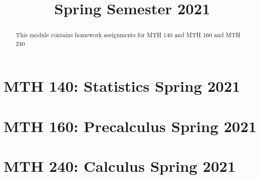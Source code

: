 \documentclass{xourse}
\title{Spring Semester 2021}
\begin{document}
  
\begin{abstract} %
This module contains homework assignments for MTH 140 and MTH 160 and MTH 240
\end{abstract}  
\maketitle  

\part{MTH 140: Statistics Spring 2021}

\part{MTH 160: Precalculus Spring 2021}


\part{MTH 240: Calculus Spring 2021}



 
\end{document}

